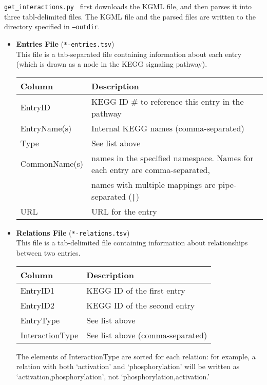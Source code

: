 \documentclass[10pt]{article}
\newcommand{\getinteractions}{\texttt{get\_interactions.py} }
\begin{document}
\getinteractions~first downloads the KGML file, and then parses it into three tabl-delimited files.  The KGML file and the parsed files are written to the directory specified in \texttt{--outdir}.
\begin{itemize}
\item \textbf{Entries File} (\texttt{*-entries.tsv})\\
This file is a tab-separated file containing information about each entry
(which is drawn as a node in the KEGG signaling pathway). 
\begin{center}
\begin{tabular}{l|l}
\textbf{Column} & \textbf{Description} \\ \hline
EntryID       & KEGG ID \# to reference this entry in the pathway\\
EntryName(s)  & Internal KEGG names (comma-separated)\\
Type         & See list above\\
CommonName(s) & names in the specified namespace.  Names for each entry are comma-separated,\\
 & names with multiple mappings are pipe-separated (\texttt{|})\\
URL           & URL for the entry
\end{tabular}
\end{center}

\item \textbf{Relations File} (\texttt{*-relations.tsv})\\
This file is a tab-delimited file containing information about relationships
between two entries.
\begin{center}
\begin{tabular}{l|l}
\textbf{Column} & \textbf{Description} \\ \hline
EntryID1 & KEGG ID of the first entry\\
EntryID2 & KEGG ID of the second entry\\
EntryType & See list above\\
InteractionType & See list above (comma-separated)
\end{tabular}
\end{center}
The elements of InteractionType are sorted for each relation: for example, a relation with both `activation' and `phosphorylation' will be written as `activation,phosphorylation', not `phosphorylation,activation.'


\end{itemize}
\end{document}
